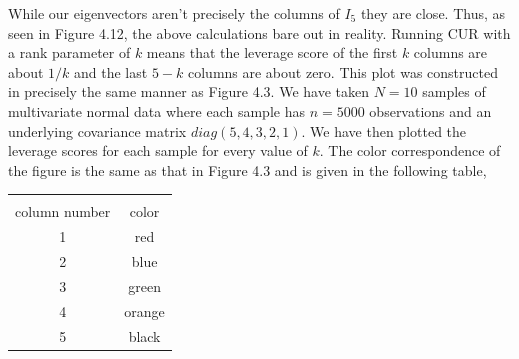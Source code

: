 \documentclass{book}
\begin{document}
While our eigenvectors aren't precisely the columns of $I_5$ they are close. Thus, as seen in Figure 4.12, the above calculations bare out in reality. Running CUR with a rank parameter of $k$ means that the leverage score of the first $k$ columns are about $1/k$ and the last $5-k$ columns are about zero. This plot was constructed in precisely the same manner as Figure 4.3. We have taken $N=10$ samples of multivariate normal data where each sample has $n=5000$ observations and an underlying covariance matrix $diag(5,4,3,2,1)$. We have then plotted the leverage scores for each sample for every value of $k$. The color correspondence of the figure is the same as that in Figure 4.3 and is given in the following table, 

\begin{center}
\begin{tabular}{|c|c|}
\hline&\\
column number& color\\\hline
1& red\\
2& blue\\
3& green\\
4& orange\\
5& black\\
\hline
\end{tabular} 
\end{center}
\end{document}
